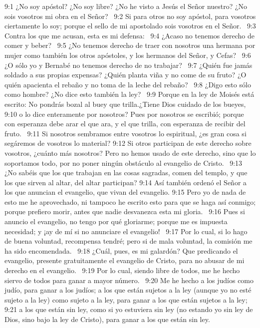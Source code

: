9:1 ¿No soy apóstol? ¿No soy libre? ¿No he visto a Jesús el Señor nuestro? ¿No sois vosotros mi obra en el Señor?  
9:2 Si para otros no soy apóstol, para vosotros ciertamente lo soy; porque el sello de mi apostolado sois vosotros en el Señor.  
9:3 Contra los que me acusan, esta es mi defensa:  
9:4 ¿Acaso no tenemos derecho de comer y beber?  
9:5 ¿No tenemos derecho de traer con nosotros una hermana por mujer como también los otros apóstoles, y los hermanos del Señor, y Cefas?  
9:6 ¿O sólo yo y Bernabé no tenemos derecho de no trabajar?  
9:7 ¿Quién fue jamás soldado a sus propias expensas? ¿Quién planta viña y no come de su fruto? ¿O quién apacienta el rebaño y no toma de la leche del rebaño?  
9:8 ¿Digo esto sólo como hombre? ¿No dice esto también la ley?  
9:9 Porque en la ley de Moisés está escrito: No pondrás bozal al buey que trilla.¿Tiene Dios cuidado de los bueyes,  
9:10 o lo dice enteramente por nosotros? Pues por nosotros se escribió; porque con esperanza debe arar el que ara, y el que trilla, con esperanza de recibir del fruto.  
9:11 Si nosotros sembramos entre vosotros lo espiritual, ¿es gran cosa si segáremos de vosotros lo material? 
9:12 Si otros participan de este derecho sobre vosotros, ¿cuánto más nosotros? Pero no hemos usado de este derecho, sino que lo soportamos todo, por no poner ningún obstáculo al evangelio de Cristo.  
9:13 ¿No sabéis que los que trabajan en las cosas sagradas, comen del templo, y que los que sirven al altar, del altar participan? 
9:14 Así también ordenó el Señor a los que anuncian el evangelio, que vivan del evangelio. 
9:15 Pero yo de nada de esto me he aprovechado, ni tampoco he escrito esto para que se haga así conmigo; porque prefiero morir, antes que nadie desvanezca esta mi gloria.  
9:16 Pues si anuncio el evangelio, no tengo por qué gloriarme; porque me es impuesta necesidad; y ¡ay de mí si no anunciare el evangelio!  
9:17 Por lo cual, si lo hago de buena voluntad, recompensa tendré; pero si de mala voluntad, la comisión me ha sido encomendada.  
9:18 ¿Cuál, pues, es mi galardón? Que predicando el evangelio, presente gratuitamente el evangelio de Cristo, para no abusar de mi derecho en el evangelio.  
9:19 Por lo cual, siendo libre de todos, me he hecho siervo de todos para ganar a mayor número.  
9:20 Me he hecho a los judíos como judío, para ganar a los judíos; a los que están sujetos a la ley (aunque yo no esté sujeto a la ley) como sujeto a la ley, para ganar a los que están sujetos a la ley;  
9:21 a los que están sin ley, como si yo estuviera sin ley (no estando yo sin ley de Dios, sino bajo la ley de Cristo), para ganar a los que están sin ley.  
